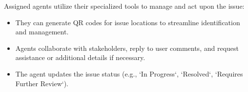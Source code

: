 Assigned agents utilize their specialized tools to manage and act upon the issue:
\begin{itemize}
    \item They can generate QR codes for issue locations to streamline identification and management.
    \item Agents collaborate with stakeholders, reply to user comments, and request assistance or additional details if necessary.
    \item The agent updates the issue status (e.g., `In Progress`, `Resolved`, `Requires Further Review`).
\end{itemize}